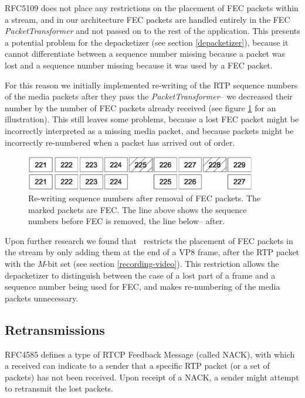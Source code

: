 \documentclass[twoside,openright,a4paper,12pt,english]{article}
\begin{document}
\medskip
RFC5109 does not place any restrictions on the placement of FEC packets within
a stream, and in our architecture FEC packets are handled entirely in the FEC
\emph{PacketTransformer} and not passed on to the rest of the application. This
presents a potential problem for the depacketizer (see section
\ref{depacketizer}), because it cannot differentiate
between a sequence number missing because a packet was lost and a sequence number missing
because it was used by a FEC packet.

For this reason we initially implemented re-writing of the RTP sequence numbers of
the media packets after they pass the \emph{PacketTransformer}-- we decreased their
number by the number of FEC packets already received (see figure \ref{fec-seqs} for an
illustration). This still leaves some problems, because a lost FEC packet might be
incorrectly interpreted as a missing media packet, and because packets might be
incorrectly re-numbered when a packet has arrived out of order.

\begin{figure}[h]
   \centering
        \includegraphics[width=0.9\textwidth]{./pics/fec-seqs.eps}
        \caption{Re-writing sequence numbers after removal of FEC packets. The
        marked packets are FEC. The line above shows the sequence numbers
        before FEC is removed, the line below-- after.}
   \label{fec-seqs}
\end{figure}

Upon further research we found that \wrtc\ restricts the placement of FEC
packets in the stream by only adding them at the end of a VP8 frame, after the
RTP packet with the \emph{M}-bit set (see section \ref{recording-video}). This
restriction allows the depacketizer to distinguish between the case of a lost
part of a frame and a sequence number being used for FEC, and makes re-numbering
of the media packets unnecessary.




\subsection{Retransmissions}
\label{rtx}
RFC4585\cite{rfc4585} defines a type of RTCP Feedback Message (called NACK), with
which a received can indicate to a sender that a specific RTP packet (or a set
of packets) has not been received. Upon receipt of a NACK, a sender might attempt to
retransmit the lost packets. 
\end{document}
